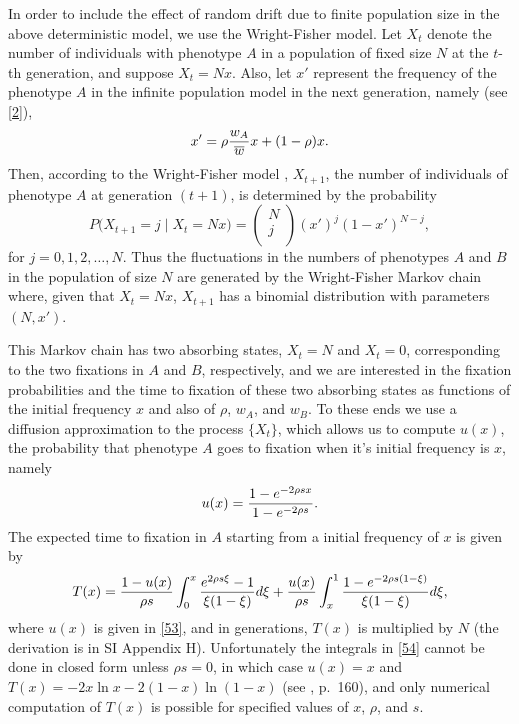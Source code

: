 \documentclass[9pt,twocolumn,twoside,lineno]{pnas-new}
\begin{document}
 In order to include the effect of random drift due to finite population size in the above deterministic model, we use the Wright-Fisher model. Let $X_t$ denote the number of individuals with phenotype $A$ in a population of fixed size $N$ at the $t$-th generation, and suppose $X_t=Nx$. Also, let $x'$ represent the frequency of the phenotype $A$ in the infinite population model in the next generation, namely (see \eqref{2}),
 \begin{equation}
 x' = \rho {w_A \over \overline w} x +(1-\rho)x.
 \label{47}\end{equation}
 Then, according to the Wright-Fisher model \cite{ewens2004mathematical}, $X_{t+1}$, the number of individuals of phenotype $A$ at generation $(t+1)$, is determined by the probability
 \begin{equation}
 P\bigl(X_{t+1} =j\mid X_t =Nx\bigr) =\left(\begin{array}{c} N\\j\\ \end{array}\right)\left(x'\right)^j\left(1-x'\right)^{N-j},
 \label{48}\end{equation}
 for $j=0,1,2,\dots,N$.
 Thus the fluctuations in the numbers of phenotypes $A$ and $B$ in the  population of size $N$ are generated by the Wright-Fisher Markov chain  where, given that $X_t=Nx$, $X_{t+1}$ has a binomial distribution with parameters $(N,x')$.
 
 This Markov chain  has two absorbing states, $X_t =N$ and $X_t=0$, corresponding to the two fixations in $A$ and $B$, respectively, and we are interested in the fixation probabilities and the time to fixation of these two absorbing states as functions of the initial frequency $x$ and also of $\rho$, $w_A$, and $w_B$.
 To these ends we use a diffusion approximation to the process $\{X_t\}$, which allows us to compute $u(x)$, the probability that phenotype $A$ goes to fixation when it's initial frequency is $x$, namely
  \begin{equation}
  u(x) ={1-e^{-2\rho sx}\over 1-e^{-2\rho s}}.
 \label{53} \end{equation}
 The expected time to fixation in $A$ starting from a initial frequency of $x$ is given by
 \begin{equation}
 T(x)={1-u(x)\over\rho s}\int_0^x{e^{2\rho s\xi}-1\over \xi(1-\xi)}d\xi +{u(x)\over\rho s}\int_x^1{1-e^{-2\rho s(1-\xi)}\over \xi(1-\xi)}d\xi,
 \label{54}\end{equation}
 where $u(x)$ is given in \eqref{53}, and in generations, $T(x)$ is multiplied by $N$ (the derivation is in SI Appendix H).
  Unfortunately the integrals in \eqref{54} cannot be done in closed form unless $\rho s=0$, in which case $u(x)=x$ and $T(x)=-2x\ln x -2(1-x)\ln(1-x)$ (see \cite{ewens2004mathematical}, p.\ 160), and only numerical computation of $T(x)$ is possible for specified values of $x$, $\rho$, and $s$.
  
\end{document}
